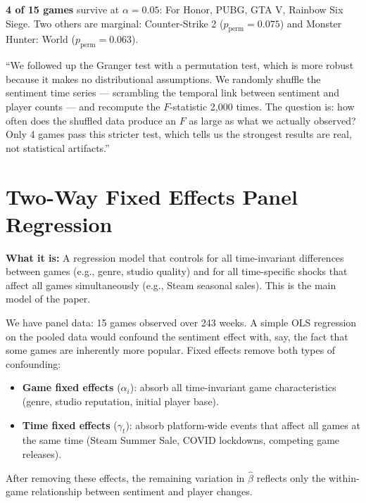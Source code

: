\documentclass[11pt, letterpaper]{article}
\theoremstyle{definition}
\begin{document}
\begin{resultbox}
\textbf{4 of 15 games} survive at $\alpha = 0.05$: For Honor, PUBG, GTA V, Rainbow Six Siege.
Two others are marginal: Counter-Strike 2 ($p_{\text{perm}} = 0.075$) and Monster Hunter: World ($p_{\text{perm}} = 0.063$).
\end{resultbox}

\begin{speakerbox}
``We followed up the Granger test with a permutation test, which is more robust because it makes no distributional assumptions.
We randomly shuffle the sentiment time series --- scrambling the temporal link between sentiment and player counts --- and recompute the $F$-statistic 2,000 times.
The question is: how often does the shuffled data produce an $F$ as large as what we actually observed?
Only 4 games pass this stricter test, which tells us the strongest results are real, not statistical artifacts.''
\end{speakerbox}

\section{Two-Way Fixed Effects Panel Regression}

\textbf{What it is:} A regression model that controls for all time-invariant differences between games (e.g., genre, studio quality) and for all time-specific shocks that affect all games simultaneously (e.g., Steam seasonal sales). This is the main model of the paper.

\begin{whybox}
We have panel data: 15 games observed over 243 weeks.
A simple OLS regression on the pooled data would confound the sentiment effect with, say, the fact that some games are inherently more popular.
Fixed effects remove both types of confounding:
\begin{itemize}[nosep]
    \item \textbf{Game fixed effects} ($\alpha_i$): absorb all time-invariant game characteristics (genre, studio reputation, initial player base).
    \item \textbf{Time fixed effects} ($\gamma_t$): absorb platform-wide events that affect all games at the same time (Steam Summer Sale, COVID lockdowns, competing game releases).
\end{itemize}
After removing these effects, the remaining variation in $\hat{\beta}$ reflects only the within-game relationship between sentiment and player changes.
\end{whybox}
\end{document}
